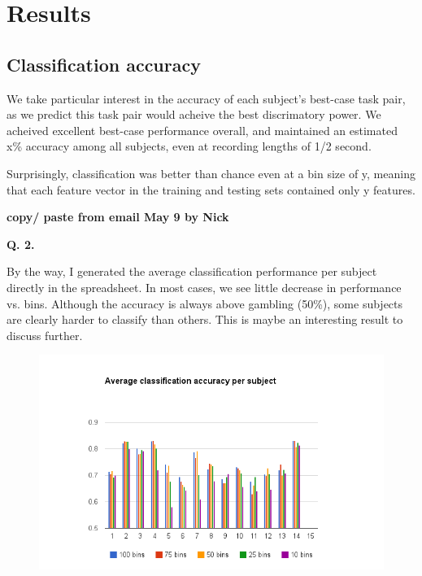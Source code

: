 \section{Results}

\subsection{Classification accuracy}

We take particular interest in the accuracy of each subject's best-case task pair, as we predict this task pair would acheive the best discrimatory power.  We acheived excellent best-case performance overall, and maintained an estimated x\% accuracy among all subjects, even at recording lengths of 1/2 second.


Surprisingly, classification was better than chance even at a bin size of y, meaning that each feature vector in the training and testing sets contained only y features.

{\bf copy/ paste from email May 9 by Nick}

{\bf Q. 2.}

    By the way, I generated the average classification performance per subject directly in the spreadsheet. In most cases, we see little decrease in performance vs. bins. Although the accuracy is always above gambling (50\%), some subjects are clearly harder to classify than others. This is maybe an interesting result to discuss further.



\begin{figure}
\begin{center}
\includegraphics[width=6in]{Figures/avg_classification_accuracy_per_subject.png}
\caption{ }
\label{ }
\end{center}
\end{figure}


